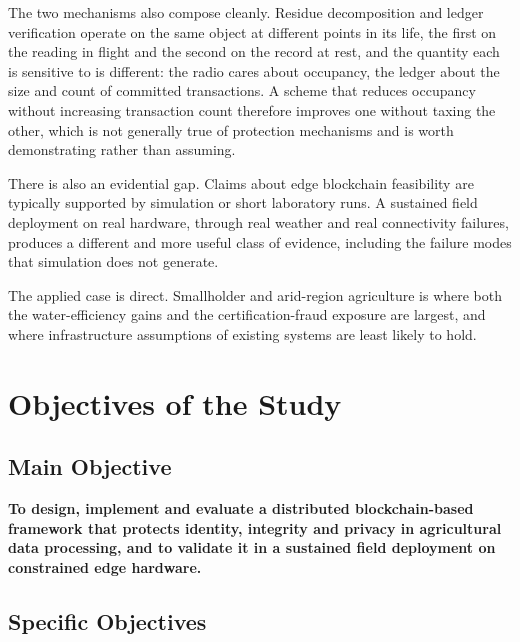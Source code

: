 \documentclass[12pt,a4paper,oneside]{book}
\begin{document}
The two mechanisms also compose cleanly. Residue
decomposition and ledger verification operate on the same object at different
points in its life, the first on the reading in flight and the second on the
record at rest, and the quantity each is sensitive to is different: the radio
cares about occupancy, the ledger about the size and count of committed
transactions. A scheme that reduces occupancy without increasing transaction
count therefore improves one without taxing the other, which is not generally
true of protection mechanisms and is worth demonstrating rather than assuming.

There is also an evidential gap. Claims about edge blockchain feasibility are
typically supported by simulation or short laboratory runs. A
sustained field deployment on real hardware, through real weather and real
connectivity failures, produces a different and more useful class of evidence,
including the failure modes that simulation does not generate.

The applied case is direct. Smallholder and arid-region agriculture is where
both the water-efficiency gains and the certification-fraud exposure are
largest, and where infrastructure assumptions of existing systems are least
likely to hold.

\section{Objectives of the Study}
\label{sec:objectives}

\subsection{Main Objective}
\label{subsec:main_objective}

\textbf{To design, implement and evaluate a distributed blockchain-based
framework that protects identity, integrity and privacy in agricultural data
processing, and to validate it in a sustained field deployment on constrained
edge hardware.}

\subsection{Specific Objectives}
\label{subsec:specific_objectives}
\end{document}
